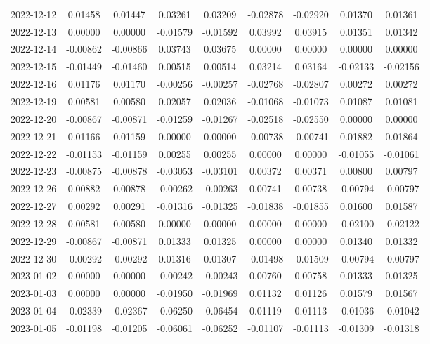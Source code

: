 {\begin{footnotesize}
\begin{longtable}{lcccccccc}
2022-12-12 & 0.01458 & 0.01447 & 0.03261 & 0.03209 & -0.02878 & -0.02920 & 0.01370 & 0.01361 \\
2022-12-13 & 0.00000 & 0.00000 & -0.01579 & -0.01592 & 0.03992 & 0.03915 & 0.01351 & 0.01342 \\
2022-12-14 & -0.00862 & -0.00866 & 0.03743 & 0.03675 & 0.00000 & 0.00000 & 0.00000 & 0.00000 \\
2022-12-15 & -0.01449 & -0.01460 & 0.00515 & 0.00514 & 0.03214 & 0.03164 & -0.02133 & -0.02156 \\
2022-12-16 & 0.01176 & 0.01170 & -0.00256 & -0.00257 & -0.02768 & -0.02807 & 0.00272 & 0.00272 \\
2022-12-19 & 0.00581 & 0.00580 & 0.02057 & 0.02036 & -0.01068 & -0.01073 & 0.01087 & 0.01081 \\
2022-12-20 & -0.00867 & -0.00871 & -0.01259 & -0.01267 & -0.02518 & -0.02550 & 0.00000 & 0.00000 \\
2022-12-21 & 0.01166 & 0.01159 & 0.00000 & 0.00000 & -0.00738 & -0.00741 & 0.01882 & 0.01864 \\
2022-12-22 & -0.01153 & -0.01159 & 0.00255 & 0.00255 & 0.00000 & 0.00000 & -0.01055 & -0.01061 \\
2022-12-23 & -0.00875 & -0.00878 & -0.03053 & -0.03101 & 0.00372 & 0.00371 & 0.00800 & 0.00797 \\
2022-12-26 & 0.00882 & 0.00878 & -0.00262 & -0.00263 & 0.00741 & 0.00738 & -0.00794 & -0.00797 \\
2022-12-27 & 0.00292 & 0.00291 & -0.01316 & -0.01325 & -0.01838 & -0.01855 & 0.01600 & 0.01587 \\
2022-12-28 & 0.00581 & 0.00580 & 0.00000 & 0.00000 & 0.00000 & 0.00000 & -0.02100 & -0.02122 \\
2022-12-29 & -0.00867 & -0.00871 & 0.01333 & 0.01325 & 0.00000 & 0.00000 & 0.01340 & 0.01332 \\
2022-12-30 & -0.00292 & -0.00292 & 0.01316 & 0.01307 & -0.01498 & -0.01509 & -0.00794 & -0.00797 \\
2023-01-02 & 0.00000 & 0.00000 & -0.00242 & -0.00243 & 0.00760 & 0.00758 & 0.01333 & 0.01325 \\
2023-01-03 & 0.00000 & 0.00000 & -0.01950 & -0.01969 & 0.01132 & 0.01126 & 0.01579 & 0.01567 \\
2023-01-04 & -0.02339 & -0.02367 & -0.06250 & -0.06454 & 0.01119 & 0.01113 & -0.01036 & -0.01042 \\
2023-01-05 & -0.01198 & -0.01205 & -0.06061 & -0.06252 & -0.01107 & -0.01113 & -0.01309 & -0.01318 \\

\end{longtable}
\end{footnotesize}}
